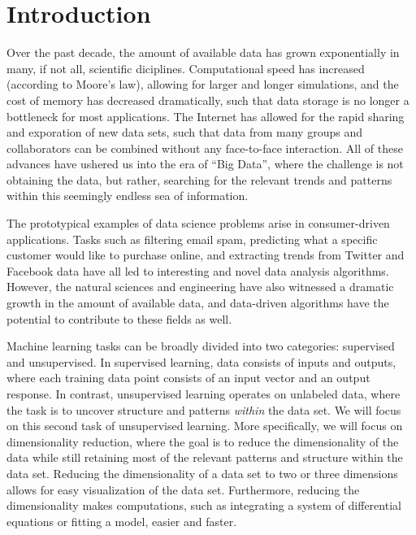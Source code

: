 
\chapter{Introduction\label{ch:intro}}

Over the past decade, the amount of available data has grown exponentially in many, if not all, scientific diciplines. 
%
Computational speed has increased (according to Moore's law), allowing for larger and longer simulations, and
the cost of memory has decreased dramatically, such that data storage is no longer a bottleneck for most applications. 
%
The Internet has allowed for the rapid sharing and exporation of new data sets, such that data from many groups and collaborators can be combined without any face-to-face interaction. 
%
All of these advances have ushered us into the era of ``Big Data'', where the challenge is not obtaining the data, but rather, searching for the relevant trends and patterns within this seemingly endless sea of information.

The prototypical examples of data science problems arise in consumer-driven applications. %
Tasks such as filtering email spam, predicting what a specific customer would like to purchase online, and extracting trends from Twitter and Facebook data have all led to interesting and novel data analysis algorithms. 
%
However, the natural sciences and engineering have also witnessed a dramatic growth in the amount of available data, and data-driven algorithms have the potential to contribute to these fields as well.

Machine learning tasks can be broadly divided into two categories: supervised and unsupervised. 
%
In supervised learning, data consists of inputs and outputs, where each training data point consists of an input vector and an output response. 
%
In contrast, unsupervised learning operates on unlabeled data, where the task is to uncover structure and patterns {\em within} the data set. 
%
We will focus on this second task of unsupervised learning. 
%
More specifically, we will focus on dimensionality reduction, where the goal is to reduce the dimensionality of the data while still retaining most of the relevant patterns and structure within the data set. 
%
Reducing the dimensionality of a data set to two or three dimensions allows for easy visualization of the data set. 
%
Furthermore, reducing the dimensionality makes computations, such as integrating a system of differential equations or fitting a model, easier and faster. 


